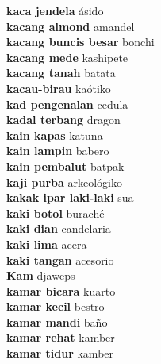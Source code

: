 \textbf{ kaca jendela  } ásido \\
\textbf{ kacang almond  } amandel \\
\textbf{ kacang buncis besar  } bonchi \\
\textbf{ kacang mede  } kashipete \\
\textbf{ kacang tanah  } batata \\
\textbf{ kacau-birau  } kaótiko \\
\textbf{ kad pengenalan  } cedula \\
\textbf{ kadal terbang  } dragon \\
\textbf{ kain kapas  } katuna \\
\textbf{ kain lampin  } babero \\
\textbf{ kain pembalut  } batpak \\
\textbf{ kaji purba  } arkeológiko \\
\textbf{ kakak ipar laki-laki  } sua \\
\textbf{ kaki botol  } buraché \\
\textbf{ kaki dian  } candelaria \\
\textbf{ kaki lima  } acera \\
\textbf{ kaki tangan  } acesorio \\
\textbf{ Kam  } djaweps \\
\textbf{ kamar bicara  } kuarto \\
\textbf{ kamar kecil  } bestro \\
\textbf{ kamar mandi  } baño \\
\textbf{ kamar rehat  } kamber \\
\textbf{ kamar tidur  } kamber \\
